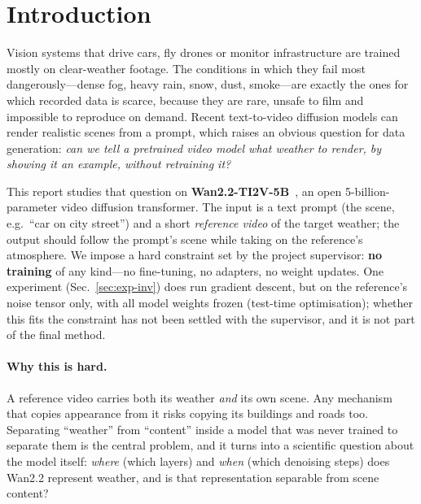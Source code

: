\documentclass[11pt,a4paper]{article}
\begin{document}
\section{Introduction}

Vision systems that drive cars, fly drones or monitor infrastructure are trained mostly on clear-weather footage.
The conditions in which they fail most dangerously---dense fog, heavy rain, snow, dust, smoke---are exactly the ones for which recorded data is scarce, because they are rare, unsafe to film and impossible to reproduce on demand.
Recent text-to-video diffusion models can render realistic scenes from a prompt, which raises an obvious question for data generation: \emph{can we tell a pretrained video model what weather to render, by showing it an example, without retraining it?}

This report studies that question on \textbf{Wan2.2-TI2V-5B}~\cite{wan2025}, an open 5-billion-parameter video diffusion transformer.
The input is a text prompt (the scene, e.g.\ ``car on city street'') and a short \emph{reference video} of the target weather; the output should follow the prompt's scene while taking on the reference's atmosphere.
We impose a hard constraint set by the project supervisor: \textbf{no training} of any kind---no fine-tuning, no adapters, no weight updates. One experiment (Sec.~\ref{sec:exp-inv}) does run gradient descent, but on the reference's noise tensor only, with all model weights frozen (test-time optimisation); whether this fits the constraint has not been settled with the supervisor, and it is not part of the final method.

\paragraph{Why this is hard.}
A reference video carries both its weather \emph{and} its own scene.
Any mechanism that copies appearance from it risks copying its buildings and roads too.
Separating ``weather'' from ``content'' inside a model that was never trained to separate them is the central problem, and it turns into a scientific question about the model itself: \emph{where} (which layers) and \emph{when} (which denoising steps) does Wan2.2 represent weather, and is that representation separable from scene content?
\end{document}
